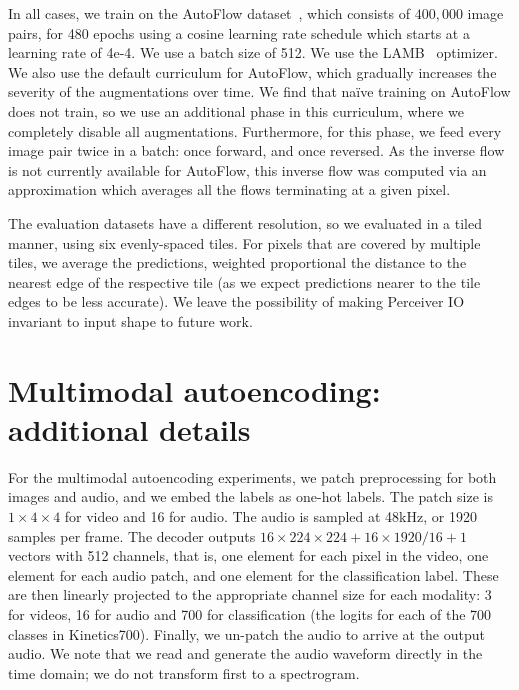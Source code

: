 \documentclass{article} %
\newcommand{\ourmodel}{Perceiver IO\xspace}
\begin{document}
In all cases, we train on the AutoFlow dataset~\citep{sun2021autoflow}, which consists of $400,000$ image pairs, for 480 epochs using a cosine learning rate schedule which starts at a learning rate of 4e-4.  We use a batch size of 512.  We use the LAMB~\citep{you2019lamb} optimizer. We also use the default curriculum for AutoFlow, which gradually increases the severity of the augmentations over time. We find that na\"{i}ve training on AutoFlow does not train, so we use an additional phase in this curriculum, where we completely disable all augmentations.  Furthermore, for this phase, we feed every image pair twice in a batch: once forward, and once reversed.  As the inverse flow is not currently available for AutoFlow, this inverse flow was computed via an approximation which averages all the flows terminating at a given pixel.

The evaluation datasets have a different resolution, so we evaluated in a tiled manner, using six evenly-spaced tiles.  For pixels that are covered by multiple tiles, we average the predictions, weighted proportional the distance to the nearest edge of the respective tile (as we expect predictions nearer to the tile edges to be less accurate).  We leave the possibility of making \ourmodel{} invariant to input shape to future work.

\section{Multimodal autoencoding: additional details}
\label{sec:multimodal_supp}

For the multimodal autoencoding experiments, we patch preprocessing for both images and audio,
and we embed the labels as one-hot labels. The patch size is $1\times 4 \times 4$ for video
and 16 for audio. The audio is sampled at 48kHz, or 1920 samples per frame.
The decoder outputs $16\times 224 \times 224 + 16 \times 1920 / 16 + 1$ vectors with 512 channels,
that is, one element for each pixel in the video, one element for each audio patch, and one element for the classification label.
These are then linearly projected to the appropriate channel size for each modality:
3 for videos, 16 for audio and 700 for classification (the logits for each of the 700 classes in Kinetics700).
Finally, we un-patch the audio to arrive at the output audio.
We note that we read and generate the audio waveform directly in the time domain;
we do not transform first to a spectrogram.

\begin{table}
        \centering
{}
\vspace*{0.1cm}
\caption{\small \label{tab:autoencoding_supp} Additional details of the model used for Multimodal autoencoding.}
\vspace{-5pt}
\end{table}
\end{document}
